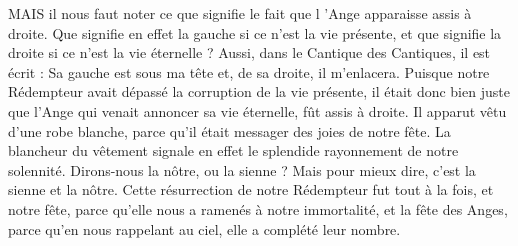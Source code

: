  MAIS il nous faut noter ce que signifie le fait que l ’Ange apparaisse assis à droite. Que signifie en effet la gauche si ce n’est la vie présente, et que signifie la droite si ce n’est la vie éternelle ? Aussi, dans le Cantique des Cantiques, il est écrit : Sa gauche est sous ma tête et, de sa droite, il m’enlacera. Puisque notre Rédempteur avait dépassé la corruption de la vie présente, il était donc bien juste que l’Ange qui venait annoncer sa vie éternelle, fût assis à droite. Il apparut vêtu d’une robe blanche, parce qu’il était messager des joies de notre fête. La blancheur du vêtement signale en effet le splendide rayonnement de notre solennité. Dirons-nous la nôtre, ou la sienne ? Mais pour mieux dire, c’est la sienne et la nôtre. Cette résurrection de notre Rédempteur fut tout à la fois, et notre fête, parce qu’elle nous a ramenés à notre immortalité, et la fête des Anges, parce qu’en nous rappelant au ciel, elle a complété leur nombre.